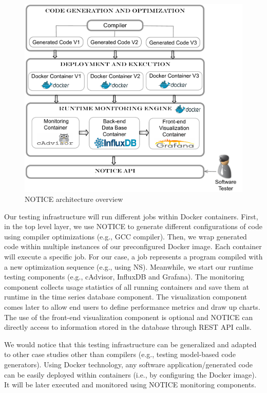 \begin{figure}[h]
\centering
	\includegraphics[width=1.\linewidth]{Ressources/genecoApproach.pdf}
	\caption{NOTICE architecture overview}
	\vspace{-0.8em}
\end{figure}
Our testing infrastructure will run different jobs within Docker containers. First, in the top level layer, we use NOTICE to generate different configurations of code using compiler optimizations (e.g., GCC compiler). Then, we wrap generated code within multiple instances of our preconfigured Docker image. Each container will execute a specific job. For our case, a job represents a program compiled with a new optimization sequence (e.g., using NS). Meanwhile, we start our runtime testing components (e.g., cAdvisor, InfluxDB and Grafana). The monitoring component collects usage statistics of all running containers and save them at runtime in the time series database component. The visualization component comes later to allow end users to define performance metrics and draw up charts. The use of the front-end visualization component is optional and NOTICE can directly access to information stored in the database through REST API calls.  

\begin{remark}
We would notice that this testing infrastructure can be generalized and adapted to other case studies other than compilers (e.g., testing model-based code generators). Using Docker technology, any software application/generated code can be easily deployed within containers (i.e., by configuring the Docker image). It will be later executed and monitored using NOTICE monitoring components. 
\end{remark}

